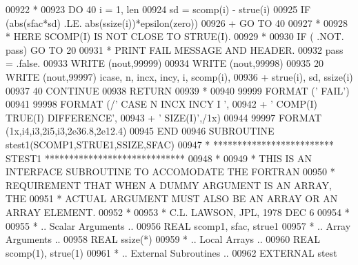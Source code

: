 \begin{DoxyCode}
00922 \textcolor{comment}{*}
00923       \textcolor{keywordflow}{DO} 40 i = 1, len
00924          sd = scomp(i) - strue(i)
00925          \textcolor{keywordflow}{IF} (abs(sfac*sd) .LE. abs(ssize(i))*epsilon(zero))
00926      +       \textcolor{keywordflow}{GO TO} 40
00927 \textcolor{comment}{*}
00928 \textcolor{comment}{*                             HERE    SCOMP(I) IS NOT CLOSE TO STRUE(I).}
00929 \textcolor{comment}{*}
00930          \textcolor{keywordflow}{IF} ( .NOT. pass) \textcolor{keywordflow}{GO TO} 20
00931 \textcolor{comment}{*                             PRINT FAIL MESSAGE AND HEADER.}
00932          pass = .false.
00933          \textcolor{keyword}{WRITE} (nout,99999)
00934          \textcolor{keyword}{WRITE} (nout,99998)
00935    20    \textcolor{keyword}{WRITE} (nout,99997) icase, n, incx, incy, i, scomp(i),
00936      +     strue(i), sd, ssize(i)
00937    40 \textcolor{keywordflow}{CONTINUE}
00938       \textcolor{keywordflow}{RETURN}
00939 \textcolor{comment}{*}
00940 99999 \textcolor{keyword}{FORMAT} (\textcolor{stringliteral}{'                                       FAIL'})
00941 99998 \textcolor{keyword}{FORMAT} (/\textcolor{stringliteral}{' CASE  N INCX INCY  I                            '},
00942      +       \textcolor{stringliteral}{' COMP(I)                             TRUE(I)  DIFFERENCE'},
00943      +       \textcolor{stringliteral}{'     SIZE(I)'},/1x)
00944 99997 \textcolor{keyword}{FORMAT} (1x,i4,i3,2i5,i3,2e36.8,2e12.4)
00945 \textcolor{keyword}{      END}
00946 \textcolor{keyword}{      SUBROUTINE }stest1(SCOMP1,STRUE1,SSIZE,SFAC)
00947 \textcolor{comment}{*     ************************* STEST1 *****************************}
00948 \textcolor{comment}{*}
00949 \textcolor{comment}{*     THIS IS AN INTERFACE SUBROUTINE TO ACCOMODATE THE FORTRAN}
00950 \textcolor{comment}{*     REQUIREMENT THAT WHEN A DUMMY ARGUMENT IS AN ARRAY, THE}
00951 \textcolor{comment}{*     ACTUAL ARGUMENT MUST ALSO BE AN ARRAY OR AN ARRAY ELEMENT.}
00952 \textcolor{comment}{*}
00953 \textcolor{comment}{*     C.L. LAWSON, JPL, 1978 DEC 6}
00954 \textcolor{comment}{*}
00955 \textcolor{comment}{*     .. Scalar Arguments ..}
00956       \textcolor{keywordtype}{REAL}              scomp1, sfac, strue1
00957 \textcolor{comment}{*     .. Array Arguments ..}
00958       \textcolor{keywordtype}{REAL}              ssize(*)
00959 \textcolor{comment}{*     .. Local Arrays ..}
00960       \textcolor{keywordtype}{REAL}              scomp(1), strue(1)
00961 \textcolor{comment}{*     .. External Subroutines ..}
00962       \textcolor{keywordtype}{EXTERNAL}          stest

\end{DoxyCode}
